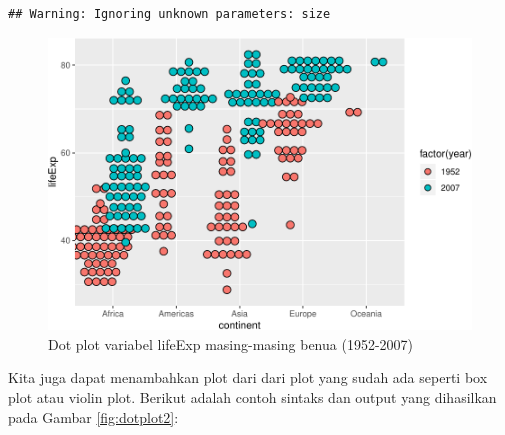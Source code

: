 \documentclass[]{book}
\newenvironment{Shaded}{\begin{snugshade}}{\end{snugshade}}
\newcommand{\KeywordTok}[1]{\textcolor[rgb]{0.13,0.29,0.53}{\textbf{#1}}}
\newcommand{\DataTypeTok}[1]{\textcolor[rgb]{0.13,0.29,0.53}{#1}}
\newcommand{\DecValTok}[1]{\textcolor[rgb]{0.00,0.00,0.81}{#1}}
\newcommand{\FloatTok}[1]{\textcolor[rgb]{0.00,0.00,0.81}{#1}}
\newcommand{\StringTok}[1]{\textcolor[rgb]{0.31,0.60,0.02}{#1}}
\newcommand{\CommentTok}[1]{\textcolor[rgb]{0.56,0.35,0.01}{\textit{#1}}}
\newcommand{\OperatorTok}[1]{\textcolor[rgb]{0.81,0.36,0.00}{\textbf{#1}}}
\newcommand{\NormalTok}[1]{#1}
\begin{document}
\begin{verbatim}
## Warning: Ignoring unknown parameters: size
\end{verbatim}

\begin{figure}

{\centering \includegraphics[width=0.7\linewidth]{EnvStat_files/figure-latex/dotplot-1} 

}

\caption{Dot plot variabel lifeExp masing-masing benua (1952-2007)}\label{fig:dotplot}
\end{figure}

Kita juga dapat menambahkan plot dari dari plot yang sudah ada seperti
box plot atau violin plot. Berikut adalah contoh sintaks dan output yang
dihasilkan pada Gambar \ref{fig:dotplot2}:

\begin{Shaded}
\end{Shaded}
\end{document}
